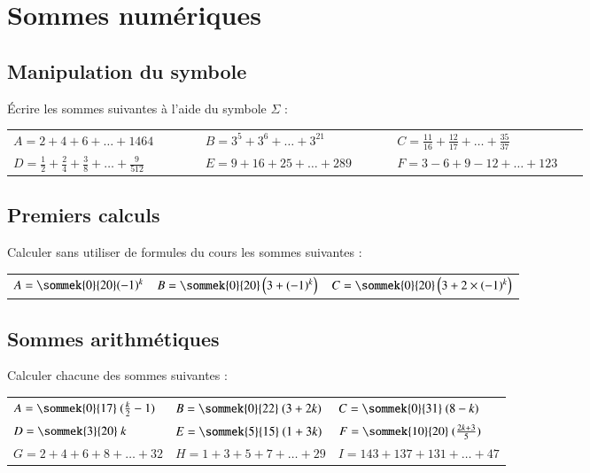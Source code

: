 \documentclass[oneside,12pt]{article}          %
\begin{document}
\section{Sommes numériques}

\subsection{Manipulation du symbole}
Écrire les sommes suivantes à l'aide du symbole $\Sigma$ : \\
\renewcommand{\arraystretch}{1.6}
\begin{tabular}{p{0.3\linewidth} p{0.3\linewidth} p{0.3\linewidth}}

    $A = 2+4+6+\ldots+1464$ & $B = 3^5+3^6+\ldots+3^{21}$ & $C = \frac{11}{16}+\frac{12}{17}+\ldots+\frac{35}{37}$\\
    $D = \frac{1}{2}+\frac{2}{4}+\frac{3}{8}+\ldots+\frac{9}{512}$ & $E = 9+16+25+\ldots+289$ & $F = 3-6+9-12+\ldots+123$    
\end{tabular}



\subsection{Premiers calculs}
Calculer sans utiliser de formules du cours les sommes suivantes :

\begin{tabular}{p{} p{} p{}}
     $A=\sommek{0}{20}(-1)^k$ & $B=\sommek{0}{20}\left(3+(-1)^k\right)$ & $C=\sommek{0}{20}\left(3+2\times(-1)^k\right)$
\end{tabular}


\subsection{Sommes arithmétiques}
Calculer chacune des sommes suivantes :
 
\renewcommand{\arraystretch}{2.2}
\begin{tabular}{p{} p{} p{}}
     $A=\sommek{0}{17}~(\frac{k}{2}-1)$ & $B=\sommek{0}{22}~(3+2k)$ & $C=\sommek{0}{31}~(8-k)$ \\
     $D=\sommek{3}{20}~k$ & $E=\sommek{5}{15}~(1+3k)$ & $F=\sommek{10}{20}~(\frac{2k+3}{5})$ \\
     $G=2+4+6+8+\ldots+32$ & $H=1+3+5+7+\ldots+29$ & $I=143+137+131+\ldots+47$ \\
\end{tabular}
\end{document}
